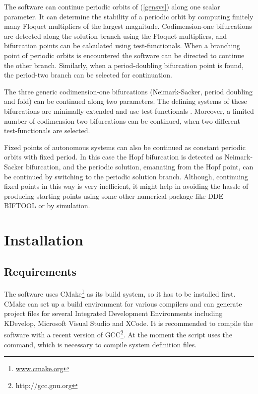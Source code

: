 \documentclass[10pt,a4paper]{ddedoc}
\begin{document}
The software can continue periodic orbits of (\ref{gensys}) along one scalar parameter. It can determine the stability of a periodic orbit by computing finitely many Floquet multipliers of the largest magnitude. Codimension-one bifurcations are detected along the solution branch using the Floquet multipliers, and bifurcation points can be calculated using test-functionals. When a branching point of periodic orbits is encountered the software can be directed to continue the other branch. Similarly, when a period-doubling bifurcation point is found, the period-two branch can be selected for continuation.

The three generic codimension-one bifurcations (Neimark-Sacker, period doubling and fold) can be continued along two parameters. The defining systems of these bifurcations are minimally extended and use test-functionals \cite{szalai-tf}. Moreover, a limited number of codimension-two bifurcations can be continued, when two different test-functionals are selected.

Fixed points of autonomous systems can also be continued as constant periodic orbits with fixed period. In this case the Hopf bifurcation is detected as Neimark-Sacker bifurcation, and the periodic solution, emanating from the Hopf point, can be continued by switching to the periodic solution branch.
Although, continuing fixed points in this way is very inefficient, it might help in avoiding the hassle of producing starting points using some other numerical package like DDE-BIFTOOL \cite{DDEBIF} or by simulation.

\section{Installation}

\subsection{Requirements}

The software uses CMake\footnote{\url{www.cmake.org}} as its build system, so it has to be installed first. CMake can set up a build environment for various compilers and can generate project files for several Integrated Development Environments including KDevelop, Microsoft Visual Studio and XCode. It is recommended to compile the software with a recent version of GCC\footnote{http://gcc.gnu.org}. At the moment the  script uses the  command, which is necessary to compile system definition files.
\end{document}
